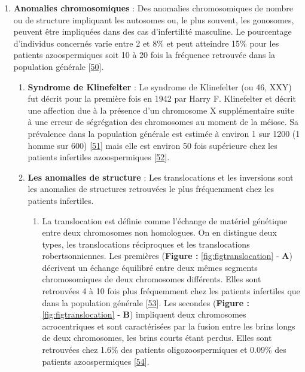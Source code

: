 \documentclass[12pt,twoside]{reedthesis}
\providecommand{\tightlist}{%
  \setlength{\itemsep}{0pt}\setlength{\parskip}{0pt}}
\theoremstyle{definition}
\theoremstyle{definition}
\theoremstyle{remark}
\begin{document}
  \begin{enumerate}
  \def\labelenumi{\arabic{enumi}.}
  \setcounter{enumi}{1}
  \tightlist
  \item
    \textbf{Anomalies chromosomiques} : Des anomalies chromosomiques de
    nombre ou de structure impliquant les autosomes ou, le plus souvent,
    les gonosomes, peuvent être impliquées dans des cas d'infertilité
    masculine. Le pourcentage d'individus concernés varie entre 2 et 8\%
    et peut atteindre 15\% pour les patients azoospermiques soit 10 à 20
    fois la fréquence retrouvée dans la population générale
    {[}\protect\hyperlink{ref-Ravel2006}{50}{]}.
  
    \begin{enumerate}
    \def\labelenumii{\alph{enumii}.}
    \item
      \textbf{Syndrome de Klinefelter} : Le syndrome de Klinefelter (ou
      46, XXY) fut décrit pour la première fois en 1942 par Harry F.
      Klinefelter et décrit une affection due à la présence d'un
      chromosome X supplémentaire suite à une erreur de ségrégation des
      chromosomes au moment de la méiose. Sa prévalence dans la population
      générale est estimée à environ 1 sur 1200 (1 homme sur 600)
      {[}\protect\hyperlink{ref-Bojesen2011}{51}{]} mais elle est environ
      50 fois supérieure chez les patients infertiles azoospermiques
      {[}\protect\hyperlink{ref-Gekas2001}{52}{]}.
    \item
      \textbf{Les anomalies de structure} : Les translocations et les
      inversions sont les anomalies de structures retrouvées le plus
      fréquemment chez les patients infertiles.
  
      \begin{enumerate}
      \def\labelenumiii{\roman{enumiii}.}
      \tightlist
      \item
        La translocation est définie comme l'échange de matériel génétique
        entre deux chromosomes non homologues. On en distingue deux types,
        les translocations réciproques et les translocations
        robertsonniennes. Les premières (\textbf{Figure :}
        \ref{fig:figtranslocation} - \textbf{A}) décrivent un échange
        équilibré entre deux mêmes segments chromosomiques de deux
        chromosomes différents. Elles sont retrouvées 4 à 10 fois plus
        fréquemment chez les patients infertiles que dans la population
        générale {[}\protect\hyperlink{ref-Elliott1997}{53}{]}. Les
        secondes (\textbf{Figure :} \ref{fig:figtranslocation} -
        \textbf{B}) impliquent deux chromosomes acrocentriques et sont
        caractérisées par la fusion entre les brins longs de deux
        chromosomes, les brins courts étant perdus. Elles sont retrouvées
        chez 1.6\% des patients oligozoospermiques et 0.09\% des patients
        azoospermiques {[}\protect\hyperlink{ref-OFlynnOBrien2010}{54}{]}.
      \end{enumerate}
    \end{enumerate}
  \end{enumerate}
  
\end{document}

